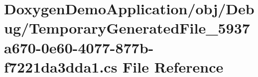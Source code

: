 \hypertarget{obj_2_debug_2_temporary_generated_file__5937a670-0e60-4077-877b-f7221da3dda1_8cs}{}\section{Doxygen\+Demo\+Application/obj/\+Debug/\+Temporary\+Generated\+File\+\_\+5937a670-\/0e60-\/4077-\/877b-\/f7221da3dda1.cs File Reference}
\label{obj_2_debug_2_temporary_generated_file__5937a670-0e60-4077-877b-f7221da3dda1_8cs}
